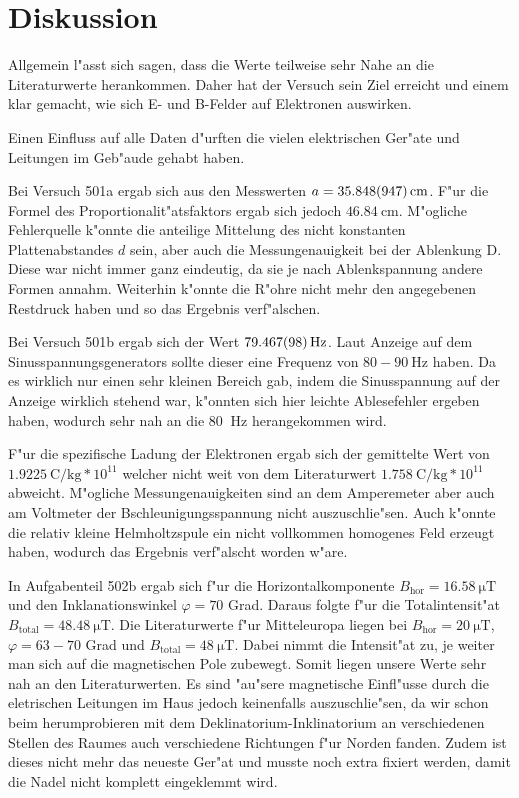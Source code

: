 \newpage
\section{Diskussion}
	\label{sec:diskussion}

	Allgemein l"asst sich sagen, dass die Werte teilweise sehr Nahe an die Literaturwerte herankommen. Daher hat der Versuch sein Ziel erreicht und einem klar gemacht, wie sich E- und B-Felder auf Elektronen auswirken. 

	Einen Einfluss auf alle Daten d"urften die vielen elektrischen Ger"ate und Leitungen im Geb"aude gehabt haben.

	Bei Versuch 501a ergab sich aus den Messwerten $a = \SI{35.848 (947)}{\centi\meter}$. F"ur die Formel des Proportionalit"atsfaktors ergab sich jedoch $\SI{46.84}{\centi\meter}$. M"ogliche Fehlerquelle k"onnte die anteilige Mittelung des nicht konstanten Plattenabstandes $d$ sein, aber auch die Messungenauigkeit bei der Ablenkung D. Diese war nicht immer ganz eindeutig, da sie je nach Ablenkspannung andere Formen annahm. Weiterhin k"onnte die R"ohre nicht mehr den angegebenen Restdruck haben und so das Ergebnis verf"alschen.

	Bei Versuch 501b ergab sich der Wert $\SI{79.467 (98)}{\hertz}$. Laut Anzeige auf dem Si\-nus\-span\-nungs\-ge\-ne\-ra\-tors sollte dieser eine Frequenz von $80 - 90 \SI{}{\hertz}$ haben. Da es wirklich nur einen sehr kleinen Bereich gab, indem die Sinusspannung auf der Anzeige wirklich stehend war, k"onnten sich hier leichte Ablesefehler ergeben haben, wodurch sehr nah an die 80 $\SI{}{\hertz}$ herangekommen wird.

	F"ur die spezifische Ladung der Elektronen ergab sich der gemittelte Wert von $\SI{1.9225}{\coulomb\per\kilo\gram}*10^{11}$ welcher nicht weit von dem Literaturwert $\SI{1.758}{\coulomb\per\kilo\gram}*10^{11}$ abweicht. M"ogliche Mess\-un\-ge\-nau\-ig\-keit\-en sind an dem Amperemeter aber auch am Voltmeter der B\-schleu\-ni\-gungs\-span\-nung nicht auszuschlie"sen. Auch k"onnte die relativ kleine Helmholtzspule ein nicht vollkommen homogenes Feld erzeugt haben, wodurch das Ergebnis verf"alscht worden w"are.

	In Aufgabenteil 502b ergab sich f"ur die Horizontalkomponente $B_\mathrm{hor} = \SI{16.58}{\micro\tesla}$ und den Inklanationswinkel $\varphi = 70$ Grad. Daraus folgte f"ur die Totalintensit"at $B_\mathrm{total} = \SI{48.48}{\micro\tesla}$. Die Literaturwerte f"ur Mitteleuropa liegen bei $B_\mathrm{hor} = \SI{20}{\micro\tesla}$, $\varphi = 63 - 70$ Grad und $B_\mathrm{total} = \SI{48}{\micro\tesla}$. Dabei nimmt die Intensit"at zu, je weiter man sich auf die magnetischen Pole zubewegt. 
	Somit liegen unsere Werte sehr nah an den Literaturwerten. Es sind "au"sere magnetische Einfl"usse durch die eletrischen Leitungen im Haus jedoch keinenfalls auszuschlie"sen, da wir schon beim herumprobieren mit dem Deklinatorium-Inklinatorium an verschiedenen Stellen des Raumes auch verschiedene Richtungen f"ur Norden fanden. Zudem ist dieses nicht mehr das neueste Ger"at und musste noch extra fixiert werden, damit die Nadel nicht komplett eingeklemmt wird.


